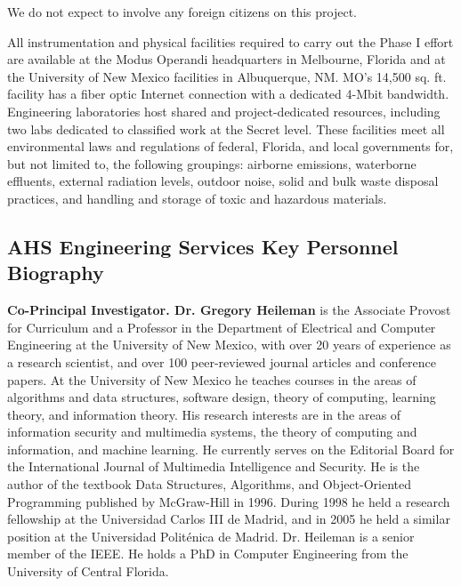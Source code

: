 \documentclass{sbir}
\begin{document}
{
We do not expect to involve any foreign citizens on this project.

 {}
All instrumentation and physical facilities required to carry out the Phase I effort are available at the Modus Operandi headquarters in Melbourne, Florida and at the University of New Mexico facilities in Albuquerque, NM. MO's 14,500 sq. ft. facility has a fiber optic Internet connection with a dedicated 4-Mbit bandwidth. Engineering laboratories host shared and project-dedicated resources, including two labs dedicated to classified work at the Secret level. These facilities meet all environmental laws and regulations of federal, Florida, and local governments for, but not limited to, the following groupings: airborne emissions, waterborne effluents, external radiation levels, outdoor noise, solid and bulk waste disposal practices, and handling and storage of toxic and hazardous materials.

\label{subs}

\subsection{AHS Engineering Services Key Personnel Biography}\label{AHS}

{\bf Co-Principal Investigator. Dr. Gregory Heileman } is the Associate Provost for Curriculum and a Professor in the Department of Electrical and Computer Engineering at the University of New Mexico, with over 20 years of experience as a research scientist, and over 100 peer-reviewed journal articles and conference papers. At the University of New Mexico he teaches courses in the areas of algorithms and data structures, software design, theory of computing, learning theory, and information theory. His research interests are in the areas of information security and multimedia systems, the theory of computing and information, and machine learning. He currently serves on the Editorial Board for the International Journal of Multimedia Intelligence and Security. He is the author of the textbook Data Structures, Algorithms, and Object-Oriented Programming published by McGraw-Hill in 1996. During 1998 he held a research fellowship at the Universidad Carlos III de Madrid, and in 2005 he held a similar position at the Universidad Polit\'enica de Madrid. Dr. Heileman is a senior member of the IEEE. He holds a PhD in Computer Engineering from the University of Central Florida.

}
\end{document}
